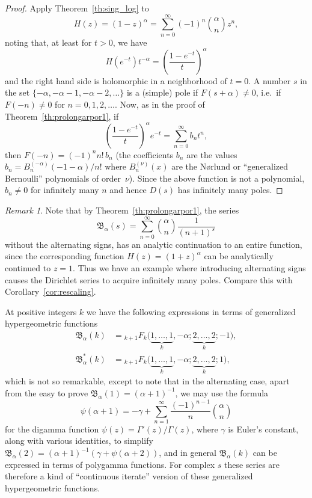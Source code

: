 \documentclass[11pt,a4paper]{amsart}
\theoremstyle{plain}
\theoremstyle{plain}
\theoremstyle{plain}
\theoremstyle{definition}
\theoremstyle{remark}
\newtheorem*{remark}{Remark}
\begin{document}
\begin{proof} 
Apply Theorem~\ref{th:sing_log} to
\[
  H(z) = (1-z)^{\alpha} = \sum_{n=0}^{\infty} (-1)^{n} \binom{\alpha}{n} z^{n},
\]
noting that, at least for $t > 0$, we have
\[
  H(e^{-t}) t^{-\alpha} = \left(\frac{1-e^{-t}}{t}\right)^\alpha
\]
and the right hand side is holomorphic in a neighborhood of $t=0$. A number $s$ in the set $\{-\alpha,\allowbreak-\alpha-1,\allowbreak-\alpha-2,\ldots\}$ is a (simple) pole if $F(s + \alpha) \neq 0$, i.e.\ if $F(-n) \neq 0$ for $n = 0,1,2,\ldots$. Now, as in the proof of Theorem~\ref{th:prolongarpor1}, if
\[
  \left(\frac{1-e^{-t}}{t}\right)^{\alpha}e^{-t} = \sum_{n=0}^{\infty} b_{n} t^{n},
\]
then $F(-n) = (-1)^{n}n!\,b_{n}$ (the coefficients $b_{n}$ are the values $b_{n} = B_{n}^{(-\alpha)}(-1-\alpha)/n!$ where $B_{n}^{(\nu)}(x)$ are the N{\o}rlund or ``generalized Bernoulli'' polynomials of order~$\nu$). Since the above function is not a polynomial, $b_{n} \neq 0$ for infinitely many $n$ and hence $D(s)$ has infinitely many poles. 
\end{proof}

\begin{remark} 
Note that by Theorem~\ref{th:prolongarpor1}, the series
\[
  \mathfrak{B}_{\alpha}(s) = \sum_{n=0}^{\infty} \binom{\alpha}{n}\frac{1}{(n+1)^s}
\]
without the alternating signs, has an analytic continuation to an entire function, since the corresponding function $H(z) =(1+z)^\alpha$ can be analytically continued to $z=1$. Thus we have an example where introducing alternating signs causes the Dirichlet series to acquire infinitely many poles. Compare this with Corollary~\ref{cor:rescaling}.

At positive integers $k$ we have the following expressions in terms of generalized hypergeometric functions
\begin{align*}
  \mathfrak{B}_{\alpha}(k)
  &= {}_{k+1}F_{k}\big(\underbrace{1,\ldots,1}_{k},-\alpha; \underbrace{2,\ldots,2}_{k}; -1\big),
  \\
  \mathfrak{B}^{*}_{\alpha}(k)
  &= {}_{k+1}F_{k}\big(\underbrace{1,\ldots,1}_{k},-\alpha; \underbrace{2,\ldots,2}_{k}; 1\big),
\end{align*}
which is not so remarkable, except to note that in the alternating case, apart from the easy to prove $\mathfrak{B}_{\alpha}(1) = (\alpha+1)^{-1}$, we may use the formula
\[
  \psi(\alpha + 1) = -\gamma + \sum_{n=1}^{\infty} \frac{(-1)^{n-1}}{n} \binom{\alpha}{n}
\]
for the digamma function $\psi(z) = \Gamma'(z)/\Gamma(z)$, where $\gamma$ is Euler's constant, along with various identities, to simplify $\mathfrak{B}_{\alpha}(2) = (\alpha+1)^{-1}(\gamma + \psi(\alpha + 2))$, and in general $\mathfrak{B}_{\alpha}(k)$ can be expressed in terms of polygamma functions. For complex $s$ these series are therefore a kind of ``continuous iterate'' version of these generalized hypergeometric functions.
\end{remark}
\end{document}

